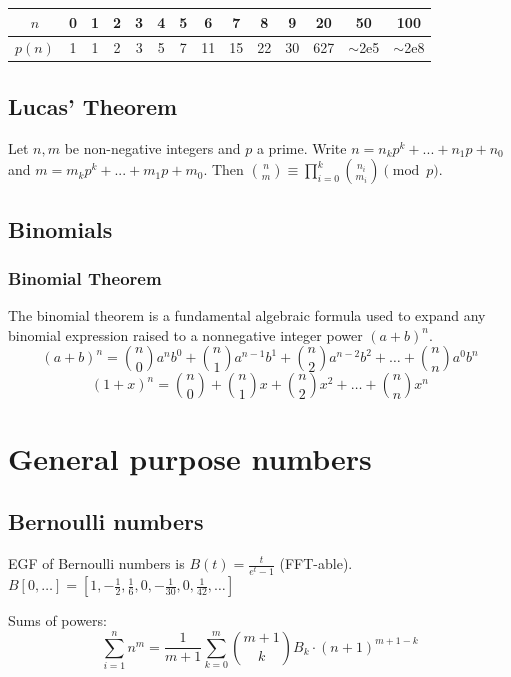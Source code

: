 		\begin{center}
		\begin{tabular}{c|c@{\ }c@{\ }c@{\ }c@{\ }c@{\ }c@{\ }c@{\ }c@{\ }c@{\ }c@{\ }c@{\ }c@{\ }c}
			$n$    & 0 & 1 & 2 & 3 & 4 & 5 & 6  & 7  & 8  & 9  & 20  & 50  & 100 \\ \hline
			$p(n)$ & 1 & 1 & 2 & 3 & 5 & 7 & 11 & 15 & 22 & 30 & 627 & $\mathtt{\sim}$2e5 & $\mathtt{\sim}$2e8 \\
		\end{tabular}
		\end{center}
		\vspace{1.5em}

	\subsection{Lucas' Theorem}
		Let $n,m$ be non-negative integers and $p$ a prime. Write $n=n_kp^k+...+n_1p+n_0$ and $m=m_kp^k+...+m_1p+m_0$. Then $\binom{n}{m} \equiv \prod_{i=0}^k\binom{n_i}{m_i} \pmod{p}$.

	\subsection{Binomials}
		\subsubsection{Binomial Theorem}
		The binomial theorem is a fundamental algebraic formula used to expand any binomial expression raised to a nonnegative integer power $(a+b)^n$.
		$$(a+b)^n = \binom{n}{0}a^n b^0 + \binom{n}{1}a^{n-1}b^1 + \binom{n}{2}a^{n-2}b^2 + \dots + \binom{n}{n}a^0b^n$$
		$$(1+x)^n = \binom{n}{0} + \binom{n}{1}x + \binom{n}{2}x^2 + \dots + \binom{n}{n}x^n$$

\section{General purpose numbers}
	\subsection{Bernoulli numbers}
		EGF of Bernoulli numbers is $B(t)=\frac{t}{e^t-1}$ (FFT-able).
		$B[0,\ldots] = [1, -\frac{1}{2}, \frac{1}{6}, 0, -\frac{1}{30}, 0, \frac{1}{42}, \ldots]$

		Sums of powers:
		\small
		\[ \sum_{i=1}^n n^m = \frac{1}{m+1} \sum_{k=0}^m \binom{m+1}{k} B_k \cdot (n+1)^{m+1-k} \]
		\normalsize

